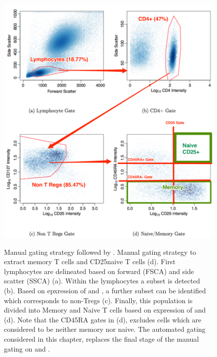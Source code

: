 \begin{figure}
\centering
\begin{minipage}{.8\textwidth}
\includegraphics[width=\linewidth]{figures/il2ra-manual-gating-strategy}
\end{minipage}
{Manual gating strategy followed by \citet{Dendrou:2009dv}.}
{
Manual gating strategy to extract memory T cells and CD25\positive naive T cells (d).
First lymphocytes are delineated based on forward (FSCA) and side scatter (SSCA) (a).
Within the lymphocytes a \positive subset is detected (b).
Based on epxression of  and , a further subset can be identified which corresponds to non-Tregs (c).
Finally, this population is divided into Memory and Naive T cells based on expression of  and  (d).
Note that the CD45RA gates in (d), excludes cells which are considered to be neither memory nor naive.
The automated gating considered in this chapter, replaces the final stage of the manual gating on  and .
}
\end{figure}

